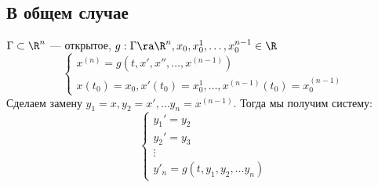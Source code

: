 \subsection{В общем случае}
\(\Gamma \subset \R^n\) --- открытое, \(g: \Gamma \ra \R^n, x_0, x_0^1, \dots, x_0^{n - 1} \in \R\)
\begin{equation}
    \begin{cases}
        x^{(n)} = g(t, x', x'', \dots, x^{(n - 1)}) \\
        x(t_0) = x_0, x'(t_0) = x_0^1, \dots, x^{(n - 1)}(t_0) = x_0^{(n - 1)}
    \end{cases}
\end{equation}
Сделаем замену \(y_1 = x, y_2 = x', \dots y_n = x^{(n - 1)}\). Тогда мы получим систему:
\begin{equation}
    \begin{cases}
        y_1' = y_2 \\
        y_2' = y_3 \\
        \vdots \\
        y'_n = g(t, y_1, y_2, \dots y_n)
    \end{cases}
\end{equation}

